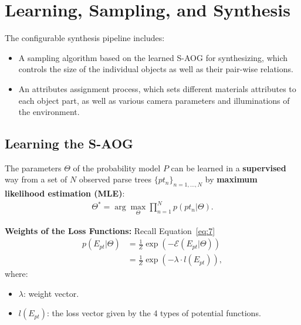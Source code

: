 \documentclass[10pt]{article}
\newcommand{\Eq}[1]{Equation~\ref{eq:#1}}
\begin{document}
\section{Learning, Sampling, and Synthesis}%
\label{sec:learning_sampling_synthesis}
The configurable synthesis pipeline includes:
%
\begin{itemize}
  \item A sampling algorithm based on the learned S-AOG for synthesizing, which
    controls the size of the individual objects as well as their pair-wise
    relations.
  \item An attributes assignment process, which sets different materials
    attributes to each object part, as well as various camera parameters and
    illuminations of the environment.
\end{itemize}

\subsection{Learning the S-AOG}%
\label{sec:learning}
The parameters $\Theta$ of the probability model $P$ can be learned in a
\textbf{supervised} way from a set of $N$ observed parse trees
${\{pt_n\}}_{n=1, \ldots, N}$ by \textbf{maximum likelihood estimation (MLE)}:
%
\begin{align}
  \label{eq:17}
  \Theta^* = \arg \max_{\Theta} \prod^N_{n=1} p(pt_n \vert \Theta).
\end{align}

\textbf{Weights of the Loss Functions:} Recall \Eq{7}
%
\begin{align}
  p(E_{pt} \vert \Theta) &= \frac{1}{Z} \exp (-\mathcal{E}(E_{pt} \vert \Theta)) \label{eq:18} \\
                         &= \frac{1}{Z} \exp (-\lambda \cdot l(E_{pt})), \label{eq:19} 
\end{align}
%
where:
%
\begin{itemize}
  \item $\lambda$: weight vector.
  \item $l(E_{pt})$: the loss vector given by the 4 types of potential functions.
\end{itemize}
\end{document}
